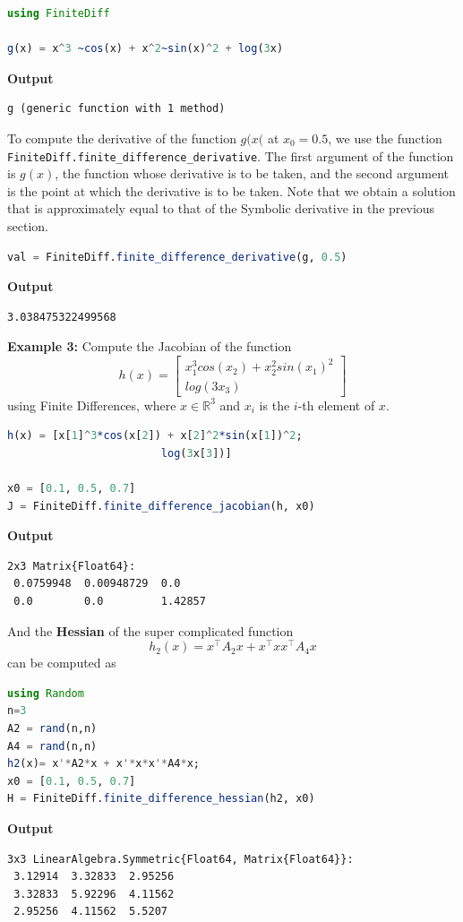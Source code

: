\begin{lstlisting}[language=Julia,style=mystyle]
using FiniteDiff 

g(x) = x^3 ~cos(x) + x^2~sin(x)^2 + log(3x)
\end{lstlisting}
\textbf{Output} 
\begin{verbatim}
g (generic function with 1 method)
\end{verbatim}

To compute the derivative of the function $g(x($ at $x_0=0.5$, we use the function \texttt{FiniteDiff.finite\_difference\_derivative}. The first argument of the function is $g(x)$, the function whose derivative is to be taken, and the second argument is the point at which the derivative is to be taken. Note that we obtain a solution that is approximately equal to that of the Symbolic derivative in the previous section.

\begin{lstlisting}[language=Julia,style=mystyle]
val = FiniteDiff.finite_difference_derivative(g, 0.5)
\end{lstlisting}
\textbf{Output} 
\begin{verbatim}
3.038475322499568
\end{verbatim}

\textbf{Example 3:} Compute the Jacobian of the function 
$$ h(x) = \begin{bmatrix} x_1^3cos(x_2) + x_2^2sin(x_1)^2 \\
      log(3x_3) \end{bmatrix}$$ 
using Finite Differences,
where $x \in \mathbb{R}^3$ and $x_i$ is the $i$-{th} element of $x$.

\begin{lstlisting}[language=Julia,style=mystyle]
h(x) = [x[1]^3*cos(x[2]) + x[2]^2*sin(x[1])^2;
                        log(3x[3])]

x0 = [0.1, 0.5, 0.7]
J = FiniteDiff.finite_difference_jacobian(h, x0)
\end{lstlisting}
\textbf{Output} 
\begin{verbatim}
2x3 Matrix{Float64}:
 0.0759948  0.00948729  0.0
 0.0        0.0         1.42857
\end{verbatim}

And the \textbf{Hessian} of the super complicated function
$$h_2(x) = x^\top A_2 x + x^\top xx^\top A_4 x$$
can be computed as

\begin{lstlisting}[language=Julia,style=mystyle]
using Random
n=3
A2 = rand(n,n) 
A4 = rand(n,n)
h2(x)= x'*A2*x + x'*x*x'*A4*x;
x0 = [0.1, 0.5, 0.7]
H = FiniteDiff.finite_difference_hessian(h2, x0)
\end{lstlisting}
\textbf{Output} 
\begin{verbatim}
3x3 LinearAlgebra.Symmetric{Float64, Matrix{Float64}}:
 3.12914  3.32833  2.95256
 3.32833  5.92296  4.11562
 2.95256  4.11562  5.5207
\end{verbatim}

